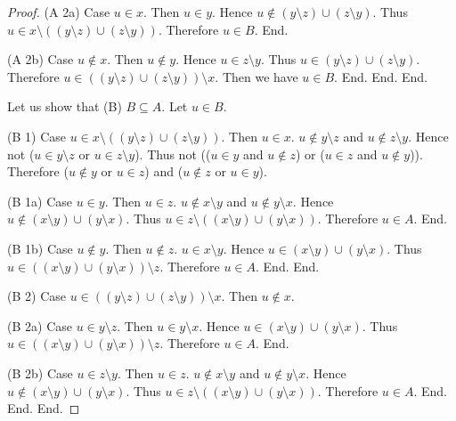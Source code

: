 \documentclass[../../sets-and-functions.ftl.tex]{subfiles}
\begin{document}
\begin{forthel}
\begin{proof}
          (A 2a) Case $u \in x$.
            Then $u \in y$.
            Hence $u \notin (y \setminus z) \cup (z \setminus y)$.
            Thus $u \in x \setminus ((y \setminus z) \cup (z \setminus y))$.
            Therefore $u \in B$.
          End.

          (A 2b) Case $u \notin x$.
            Then $u \notin y$.
            Hence $u \in z \setminus y$.
            Thus $u \in (y \setminus z) \cup (z \setminus y)$.
            Therefore $u \in ((y \setminus z) \cup (z \setminus y)) \setminus x$.
            Then we have $u \in B$.
          End.
        End.
      End.

      Let us show that (B) $B \subseteq A$.
        Let $u \in B$.

        (B 1) Case $u \in x \setminus ((y \setminus z) \cup (z \setminus y))$.
          Then $u \in x$.
          $u \notin y \setminus z$ and $u \notin z \setminus y$.
          Hence not ($u \in y \setminus z$ or $u \in z \setminus y$).
          Thus not (($u \in y$ and $u \notin z$) or ($u \in z$ and
          $u \notin y$)).
          Therefore ($u \notin y$ or $u \in z$) and ($u \notin z$ or $u \in y$).

          (B 1a) Case $u \in y$.
            Then $u \in z$.
            $u \notin x \setminus y$ and $u \notin y \setminus x$.
            Hence $u \notin (x \setminus y) \cup (y \setminus x)$.
            Thus $u \in z \setminus ((x \setminus y) \cup (y \setminus x))$.
            Therefore $u \in A$.
          End.

          (B 1b) Case $u \notin y$.
            Then $u \notin z$.
            $u \in x \setminus y$.
            Hence $u \in (x \setminus y) \cup (y \setminus x)$.
            Thus $u \in ((x \setminus y) \cup (y \setminus x)) \setminus z$.
            Therefore $u \in A$.
          End.
        End.

        (B 2) Case $u \in ((y \setminus z) \cup (z \setminus y)) \setminus x$.
          Then $u \notin x$.

          (B 2a) Case $u \in y \setminus z$.
            Then $u \in y \setminus x$.
            Hence $u \in (x \setminus y) \cup (y \setminus x)$.
            Thus $u \in ((x \setminus y) \cup (y \setminus x)) \setminus z$.
            Therefore $u \in A$.
          End.

          (B 2b) Case $u \in z \setminus y$.
            Then $u \in z$.
            $u \notin x \setminus y$ and $u \notin y \setminus x$.
            Hence $u \notin (x \setminus y) \cup (y \setminus x)$.
            Thus $u \in z \setminus ((x \setminus y) \cup (y \setminus x))$.
            Therefore $u \in A$.
          End.
        End.
      End.
    \end{proof}



\end{forthel}
\end{document}

